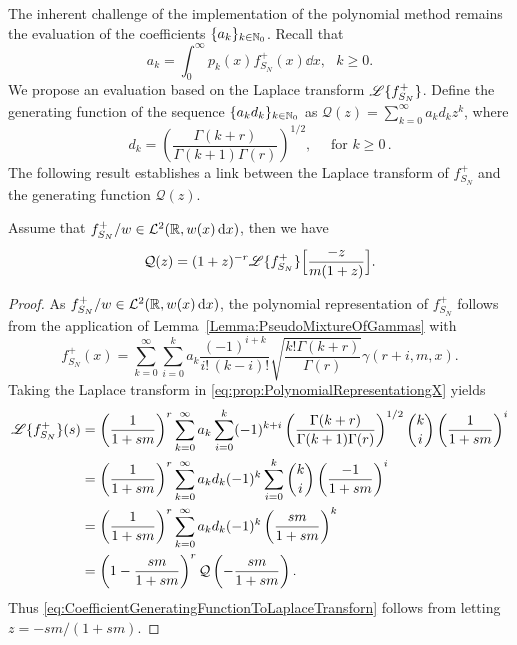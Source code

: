 The inherent challenge of the implementation of the polynomial method remains the evaluation of the coefficients $\{a_k \}_{k \in \mathbb{N}_0}$. Recall that
\begin{equation*}
a_{k}=\int_{0}^{\infty}p_k(x)f_{S_N}^+(x)\dd x,\text{ }k\geq0.
\end{equation*}
We propose an evaluation based on the Laplace transform $\mathscr{L}\{f_{S_N}^+\}$. Define the generating function of the sequence $\{a_k d_k \}_{k \in \mathbb{N}_0}$ as $\mathcal{Q}(z)=\sum_{k=0}^{\infty}a_{k}d_{k}z^{k}$, where
\begin{equation*}\label{eq:ck}
d_k= \left(\frac{\Gamma(k+r)}{\Gamma(k+1)\Gamma(r)}\right)^{1/2}, \quad \text{ for }k\geq0 \,.
\end{equation*}
The following result establishes a link between the Laplace transform of $f_{S_N}^+$  and the generating function $\mathcal{Q}(z)$.
\begin{proposition}\label{prop:LaplaceTransformPolynomialRepresentation}
Assume that $f_{S_N}^+/w\in\mathcal{L}^2(\mathbb{R}, w(x) \mathop{}\!\mathrm{d} x)$, then we have
\begin{equation}\label{eq:CoefficientGeneratingFunctionToLaplaceTransforn}
\mathcal{Q}(z)=(1+z)^{-r}\mathscr{L}\{f_{S_N}^+\}\Big[\frac{-z}{m(1+z)}\Big].
\end{equation}
\end{proposition}
\begin{proof}
As $f_{S_N}^+/w\in\mathcal{L}^2(\mathbb{R}, w(x) \mathop{}\!\mathrm{d} x)$, the polynomial representation of $f_{S_N}^+$ follows from the application of Lemma~\ref{Lemma:PseudoMixtureOfGammas} with
\begin{equation}\label{eq:prop:PolynomialRepresentationgX}
f_{S_N}^+(x)=\sum_{k=0}^{\infty}\sum_{i=0}^{k}a_k\frac{(-1)^{i+k}}{i! \, (k-i)!} \sqrt{\frac{k! \Gamma(k+r)}{\Gamma(r)}}\gamma(r+i,m,x).
\end{equation}
Taking the Laplace transform in \eqref{eq:prop:PolynomialRepresentationgX} yields
\begin{align*} %
\LT{f_{S_N}^+}(s)
&= \left(\frac{1}{1+sm}\right)^{r}\sum_{k=0}^{\infty}a_k \sum_{i=0}^{k} (-1)^{k+i} \left(\frac{\Gamma(k+r)}{\Gamma(k+1)\Gamma(r)}\right)^{1/2} \binom{k}{i} \left(\frac{1}{1+sm}\right)^{i}\nonumber \\
&= \left(\frac{1}{1+sm}\right)^{r}\sum_{k=0}^{\infty}a_k d_k (-1)^{k} \sum_{i=0}^{k} \binom{k}{i} \left(\frac{-1}{1+sm}\right)^{i} \nonumber\\
&= \left(\frac{1}{1+sm}\right)^{r}\sum_{k=0}^{\infty}a_k d_k (-1)^{k} \left( \frac{sm}{1+sm}  \right)^{k}\nonumber \\
&= \left( 1 - \frac{sm}{1+sm}\right)^{r}\mathcal{Q}\left(-\frac{sm}{1+sm}\right).
\end{align*}
Thus \eqref{eq:CoefficientGeneratingFunctionToLaplaceTransforn} follows from letting $z= -sm / (1+sm)$.
\end{proof}
